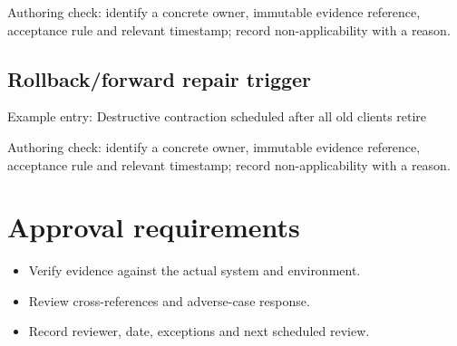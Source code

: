 \documentclass[10pt,letterpaper]{article}
\begin{document}
Authoring check: identify a concrete owner, immutable evidence reference, acceptance rule and relevant timestamp; record non-applicability with a reason.


\subsection{Rollback/forward repair trigger}
Example entry: Destructive contraction scheduled after all old clients retire

Authoring check: identify a concrete owner, immutable evidence reference, acceptance rule and relevant timestamp; record non-applicability with a reason.


\section{Approval requirements}
\begin{itemize}
\item Verify evidence against the actual system and environment.
\item Review cross-references and adverse-case response.
\item Record reviewer, date, exceptions and next scheduled review.
\end{itemize}
\end{document}
